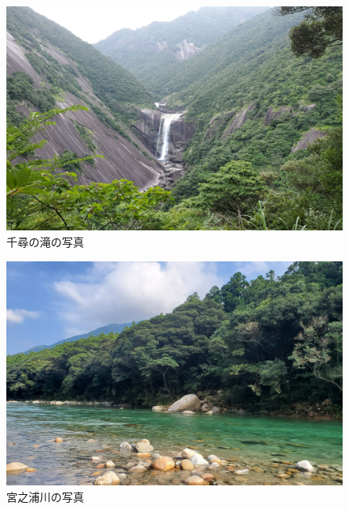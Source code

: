 \documentclass[10pt,titlepage,a5paper]{ltjsbook}
\begin{document}
      \begin{minipage}{0.38\columnwidth}
        \phantom{a\\a\\a\\a\\a\\a\\a\\a\\a}
      \end{minipage}
      \hfill
      \begin{minipage}{0.50\columnwidth}
        \begin{figure}[H]
              \centering
              \includegraphics[width=\columnwidth]{senpiro.jpg}
              \caption{千尋の滝の写真}
              \label{fig:senpiro_photo}
          \end{figure}
      \end{minipage}
      \begin{minipage}{0.50\columnwidth}
        \begin{figure}[H]
              \centering
              \includegraphics[width=\columnwidth]{miyanouragawa.jpg}
              \caption{宮之浦川の写真}
              \label{fig:miyanouragawa_photo}
          \end{figure}
      \end{minipage}
      \hfill
      \begin{minipage}{0.38\columnwidth}
        
      \end{minipage}
\end{document}
